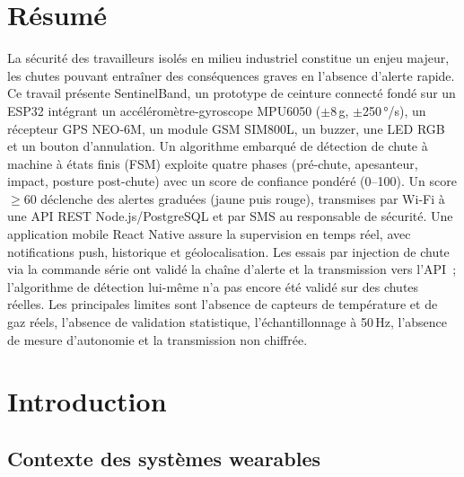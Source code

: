\documentclass[12pt,a4paper]{article}
\renewcommand{\_}{\textunderscore\allowbreak}
\begin{document}
\newpage
\section*{Résumé}

La sécurité des travailleurs isolés en milieu industriel constitue un enjeu majeur, les chutes pouvant entraîner des conséquences graves en l'absence d'alerte rapide. Ce travail présente SentinelBand, un prototype de ceinture connecté fondé sur un ESP32 intégrant un accéléromètre-gyroscope MPU6050 ($\pm$8\,g, $\pm$250\,°/s), un récepteur GPS NEO-6M, un module GSM SIM800L, un buzzer, une LED RGB et un bouton d'annulation. Un algorithme embarqué de détection de chute à machine à états finis (FSM) exploite quatre phases (pré-chute, apesanteur, impact, posture post-chute) avec un score de confiance pondéré (0--100). Un score $\geq$60 déclenche des alertes graduées (jaune puis rouge), transmises par Wi-Fi à une API REST Node.js/PostgreSQL et par SMS au responsable de sécurité. Une application mobile React Native assure la supervision en temps réel, avec notifications push, historique et géolocalisation. Les essais par injection de chute via la commande série ont validé la chaîne d'alerte et la transmission vers l'API~; l'algorithme de détection lui-même n'a pas encore été validé sur des chutes réelles. Les principales limites sont l'absence de capteurs de température et de gaz réels, l'absence de validation statistique, l'échantillonnage à 50\,Hz, l'absence de mesure d'autonomie et la transmission non chiffrée.



\newpage
\tableofcontents
\newpage

\section{Introduction}

\subsection{Contexte des systèmes wearables}
\end{document}
